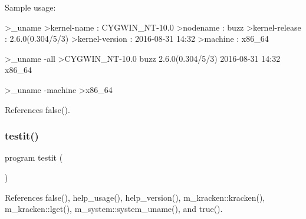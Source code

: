 Sample usage\+: \begin{DoxyVerb}>_uname
>kernel-name    : CYGWIN_NT-10.0
>nodename       : buzz
>kernel-release : 2.6.0(0.304/5/3)
>kernel-version : 2016-08-31 14:32
>machine        : x86_64

>_uname -all
>CYGWIN_NT-10.0 buzz 2.6.0(0.304/5/3) 2016-08-31 14:32 x86_64

>_uname -machine
>x86_64 \end{DoxyVerb}
 

References false().

\mbox{\label{__uname_8f90_a483d2219923eccf493a883fceee5a424}} 
\subsubsection{\texorpdfstring{testit()}{testit()}}
{\footnotesize\ttfamily program testit (\begin{DoxyParamCaption}{ }\end{DoxyParamCaption})}



References false(), help\+\_\+usage(), help\+\_\+version(), m\+\_\+kracken\+::kracken(), m\+\_\+kracken\+::lget(), m\+\_\+system\+::system\+\_\+uname(), and true().

